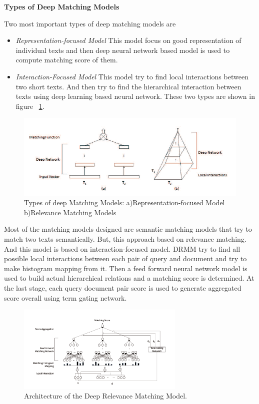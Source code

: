 \documentclass{doublecol-new}
\theoremstyle{TH}{
\newtheorem{lemma}{Lemma}
\newtheorem{theorem}[lemma]{Theorem}
\newtheorem{corrolary}[lemma]{Corrolary}
\newtheorem{conjecture}[lemma]{Conjecture}
\newtheorem{proposition}[lemma]{Proposition}
\newtheorem{claim}[lemma]{Claim}
\newtheorem{stheorem}[lemma]{Wrong Theorem}
\newtheorem{algorithm}{Algorithm}
}
\theoremstyle{THrm}{
\newtheorem{definition}{Definition}[section]
\newtheorem{question}{Question}[section]
\newtheorem{remark}{Remark}
\newtheorem{scheme}{Scheme}
}
\theoremstyle{THhit}{
\newtheorem{case}{Case}[section]
}
\begin{document}
\textbf{Types of Deep Matching Models}

Two most important types of deep matching models are 
\begin{itemize}
	\item{\em Representation-focused Model} This model focus on good representation of individual texts and then deep neural network based model is used to compute matching score of them.   
	\item{\em Interaction-Focused Model} This model try to find local interactions between two short texts. And then try to find the hierarchical interaction between texts using deep learning based neural network. These two types are shown in figure ~\ref{fig:Types of deep Macting Models}.
\end{itemize}

\begin{figure}[t]
	\centerline{\includegraphics[width=\textwidth]{image/types-matching-models.PNG}}
	\caption{Types of deep Matching Models: a)Representation-focused Model b)Relevance Matching Models}
	\label{fig:Types of deep Macting Models}
\end{figure}  

Most of the matching models designed are semantic matching models that try to match two texts semantically. But, this approach based on relevance matching. And this model is based on interaction-focused model. DRMM try to find all possible local interactions between each pair of query and document and try to make histogram mapping from it. Then a feed forward neural network model is used to build actual hierarchical relations and a matching score is determined. At the last stage, each query document pair score is used to generate aggregated score overall using term gating network. 

\begin{figure}[h]
	\centerline{\includegraphics[width=8cm,keepaspectratio]{image/deep-relevance-matching-model.PNG}}
	\caption{Architecture of the Deep Relevance Matching Model.}
	\label{fig:Architecture of the Deep Relevance Matching Model}
\end{figure} 
\end{document}
